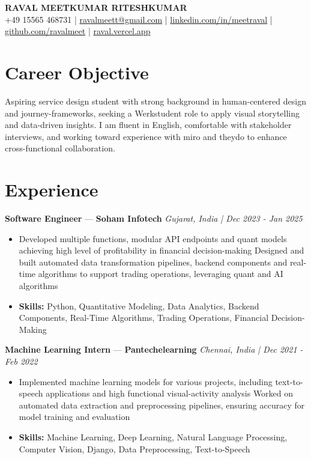 \documentclass[a4paper,10pt]{article}
\begin{document}
\begin{center}
  {\Large\bfseries RAVAL MEETKUMAR RITESHKUMAR}\\[2pt]
  {\small +49 15565 468731 \;|\; \href{mailto:ravalmeett@gmail.com}{ravalmeett@gmail.com} \;|\; \href{https://www.linkedin.com/in/meetraval/}{linkedin.com/in/meetraval} \;|\; \href{https://github.com/ravalmeet}{github.com/ravalmeet} \;|\; \href{https://raval.vercel.app/}{raval.vercel.app}}
\end{center}
\vspace{-3pt}

\section*{Career Objective}
Aspiring service design student with strong background in human-centered design and journey-frameworks, seeking a Werkstudent role to apply visual storytelling and data-driven insights. I am fluent in English, comfortable with stakeholder interviews, and working toward experience with miro and theydo to enhance cross-functional collaboration.\par

\section*{Experience}
\textbf{Software Engineer} — \textbf{Soham Infotech} \hfill \textit{Gujarat, India \;|\; Dec 2023 - Jan 2025}\par
\vspace{1pt}
\begin{itemize}
  \item Developed multiple functions, modular API endpoints and quant models achieving high level of profitability in financial decision-making Designed and built automated data transformation pipelines, backend components and real-time algorithms to support trading operations, leveraging quant and AI algorithms
  \item \textbf{Skills:} Python, Quantitative Modeling, Data Analytics, Backend Components, Real-Time Algorithms, Trading Operations, Financial Decision-Making
\end{itemize}
\vspace{3pt}
\textbf{Machine Learning Intern} — \textbf{Pantechelearning} \hfill \textit{Chennai, India \;|\; Dec 2021 - Feb 2022}\par
\vspace{1pt}
\begin{itemize}
  \item Implemented machine learning models for various projects, including text-to-speech applications and high functional visual-activity analysis Worked on automated data extraction and preprocessing pipelines, ensuring accuracy for model training and evaluation
  \item \textbf{Skills:} Machine Learning, Deep Learning, Natural Language Processing, Computer Vision, Django, Data Preprocessing, Text-to-Speech
\end{itemize}
\end{document}
